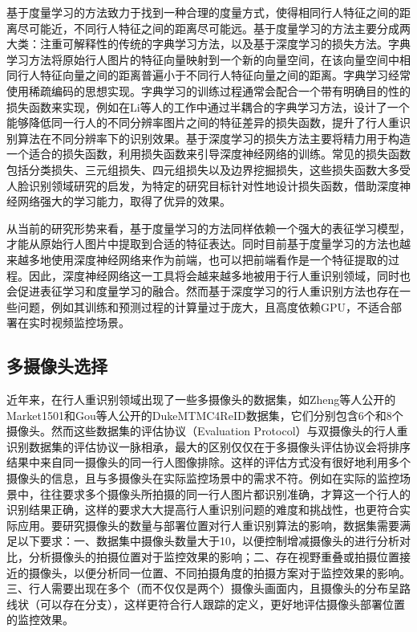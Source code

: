 基于度量学习的方法致力于找到一种合理的度量方式，使得相同行人特征之间的距离尽可能近，不同行人特征之间的距离尽可能远。基于度量学习的方法主要分成两大类：注重可解释性的传统的字典学习方法，以及基于深度学习的损失方法。字典学习方法将原始行人图片的特征向量映射到一个新的向量空间，在该向量空间中相同行人特征向量之间的距离普遍小于不同行人特征向量之间的距离。字典学习经常使用稀疏编码\cite{lee2007efficient}的思想实现。字典学习的训练过程通常会配合一个带有明确目的性的损失函数来实现，例如在Li等人\cite{li2018discriminative}的工作中通过半耦合的字典学习方法，设计了一个能够降低同一行人的不同分辨率图片之间的特征差异的损失函数，提升了行人重识别算法在不同分辨率下的识别效果。基于深度学习的损失方法主要将精力用于构造一个适合的损失函数，利用损失函数来引导深度神经网络的训练。常见的损失函数包括分类损失、三元组损失\cite{schroff2015facenet}、四元组损失\cite{chen2017beyond}以及边界挖掘损失\cite{xiao2017margin}，这些损失函数大多受人脸识别领域研究的启发，为特定的研究目标针对性地设计损失函数，借助深度神经网络强大的学习能力，取得了优异的效果。

从当前的研究形势来看，基于度量学习的方法同样依赖一个强大的表征学习模型，才能从原始行人图片中提取到合适的特征表达。同时目前基于度量学习的方法也越来越多地使用深度神经网络来作为前端，也可以把前端看作是一个特征提取的过程。因此，深度神经网络这一工具将会越来越多地被用于行人重识别领域，同时也会促进表征学习和度量学习的融合。然而基于深度学习的行人重识别方法也存在一些问题，例如其训练和预测过程的计算量过于庞大，且高度依赖GPU，不适合部署在实时视频监控场景。

\subsection{多摄像头选择}

近年来，在行人重识别领域出现了一些多摄像头的数据集，如Zheng等人公开的Market1501\cite{zheng2015scalable}和Gou等人公开的DukeMTMC4ReID\cite{gou2017dukemtmc4reid}数据集，它们分别包含6个和8个摄像头。然而这些数据集的评估协议（Evaluation Protocol）与双摄像头的行人重识别数据集的评估协议一脉相承，最大的区别仅仅在于多摄像头评估协议会将排序结果中来自同一摄像头的同一行人图像排除。这样的评估方式没有很好地利用多个摄像头的信息，且与多摄像头在实际监控场景中的需求不符。例如在实际的监控场景中，往往要求多个摄像头所拍摄的同一行人图片都识别准确，才算这一个行人的识别结果正确，这样的要求大大提高行人重识别问题的难度和挑战性，也更符合实际应用。要研究摄像头的数量与部署位置对行人重识别算法的影响，数据集需要满足以下要求：一、数据集中摄像头数量大于10，以便控制增减摄像头的进行分析对比，分析摄像头的拍摄位置对于监控效果的影响；二、存在视野重叠或拍摄位置接近的摄像头，以便分析同一位置、不同拍摄角度的拍摄方案对于监控效果的影响。三、行人需要出现在多个（而不仅仅是两个）摄像头画面内，且摄像头的分布呈路线状（可以存在分支），这样更符合行人跟踪的定义，更好地评估摄像头部署位置的监控效果。


